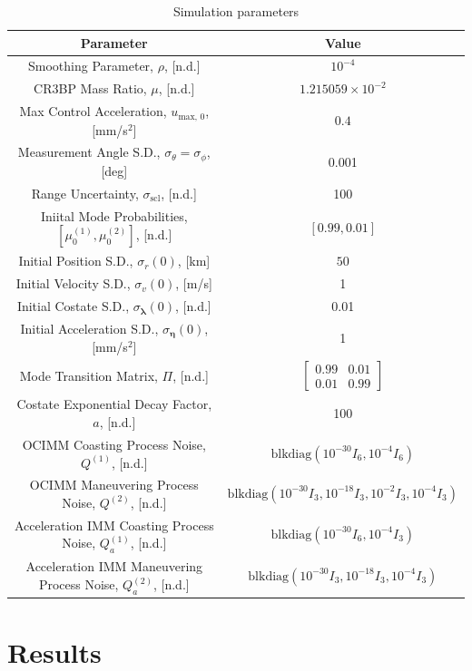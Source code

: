 \documentclass[letterpaper, preprint, paper,11pt]{AAS}	%
\begin{document}
\begin{table}
    \centering
    \caption{Simulation parameters}
    \begin{tabular}{c|c}
        Parameter & Value \\
        \hline
        Smoothing Parameter, $\rho$, [n.d.] & $10^{-4}$ \\
        CR3BP Mass Ratio, $\mu$, [n.d.] & $1.215059\times 10^{-2}$ \\
        Max Control Acceleration, $u_\text{max, 0}$, [mm/s$^2$] & $0.4$ \\
        Measurement Angle S.D., $\sigma_\theta=\sigma_\phi$, [deg] & 0.001 \\
        Range Uncertainty, $\sigma_\text{scl}$, [n.d.] & 100 \\
        Iniital Mode Probabilities, $[\mu_0^{(1)}, \mu_0^{(2)}]$, [n.d.] & $[0.99, 0.01]$ \\
        Initial Position S.D., $\sigma_r(0)$, [km] & $50$ \\
        Initial Velocity S.D., $\sigma_v(0)$, [m/s] & 1 \\
        Initial Costate S.D., $\sigma_{\bm{\lambda}}(0)$, [n.d.] & 0.01  \\
        Initial Acceleration S.D., $\sigma_{\bm{\eta}}(0)$, [mm/s$^2$] & 1 \\
        Mode Transition Matrix, $\Pi$, [n.d.] & $\begin{bmatrix}
            0.99 & 0.01 \\
            0.01 & 0.99
        \end{bmatrix}$ \\
        Costate Exponential Decay Factor, $a$, [n.d.] & 100 \\
        OCIMM Coasting Process Noise, $Q^{(1)}$, [n.d.] & $\text{blkdiag}(10^{-30}I_6, 10^{-4}I_6)$ \\
        OCIMM Maneuvering Process Noise, $Q^{(2)}$, [n.d.] & $\text{blkdiag}(10^{-30}I_3, 10^{-18}I_3, 10^{-2}I_3, 10^{-4}I_3)$ \\
        Acceleration IMM Coasting Process Noise, $Q^{(1)}_a$, [n.d.] & $\text{blkdiag}(10^{-30}I_6, 10^{-4}I_3)$ \\
        Acceleration IMM Maneuvering Process Noise, $Q^{(2)}_a$, [n.d.] & $\text{blkdiag}(10^{-30}I_3, 10^{-18}I_3, 10^{-4}I_3)$
    \end{tabular}
    \label{tab:truth-parameters}
\end{table}

\section{Results}
\end{document}

